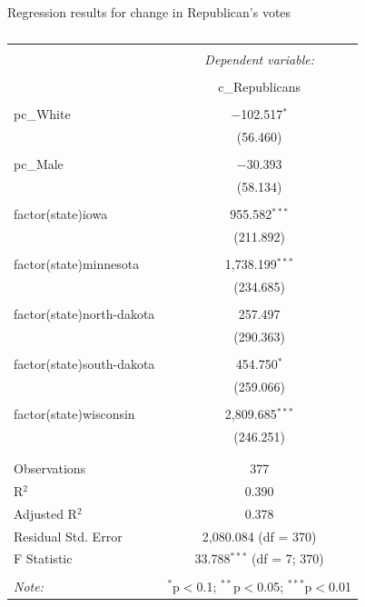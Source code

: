 \documentclass[11pt]{beamer}
\begin{document}
\begin{frame}[shrink=62]{Regression results for change in Republican's votes}
\centering
\begin{table}
  \caption{} 
  \label{Regression 1} 
\begin{tabular}{@{\extracolsep{5pt}}lc} 
\\[-1.8ex]\hline 
\hline \\[-1.8ex] 
 & \multicolumn{1}{c}{\textit{Dependent variable:}} \\ 
\cline{2-2} 
\\[-1.8ex] & c\_Republicans \\ 
\hline \\[-1.8ex] 
 pc\_White & $-$102.517$^{*}$ \\ 
  & (56.460) \\ 
  & \\ 
 pc\_Male & $-$30.393 \\ 
  & (58.134) \\ 
  & \\ 
 factor(state)iowa & 955.582$^{***}$ \\ 
  & (211.892) \\ 
  & \\ 
 factor(state)minnesota & 1,738.199$^{***}$ \\ 
  & (234.685) \\ 
  & \\ 
 factor(state)north-dakota & 257.497 \\ 
  & (290.363) \\ 
  & \\ 
 factor(state)south-dakota & 454.750$^{*}$ \\ 
  & (259.066) \\ 
  & \\ 
 factor(state)wisconsin & 2,809.685$^{***}$ \\ 
  & (246.251) \\ 
  & \\ 
\hline \\[-1.8ex]
Observations & 377 \\ 
R$^{2}$ & 0.390 \\ 
Adjusted R$^{2}$ & 0.378 \\ 
Residual Std. Error & 2,080.084 (df = 370) \\ 
F Statistic & 33.788$^{***}$ (df = 7; 370) \\ 
\hline 
\hline \\[-1.8ex] 
\textit{Note:}  & \multicolumn{1}{r}{$^{*}$p$<$0.1; $^{**}$p$<$0.05; $^{***}$p$<$0.01} \\ 
\end{tabular} 
\end{table} 
\end{frame}
\end{document}
